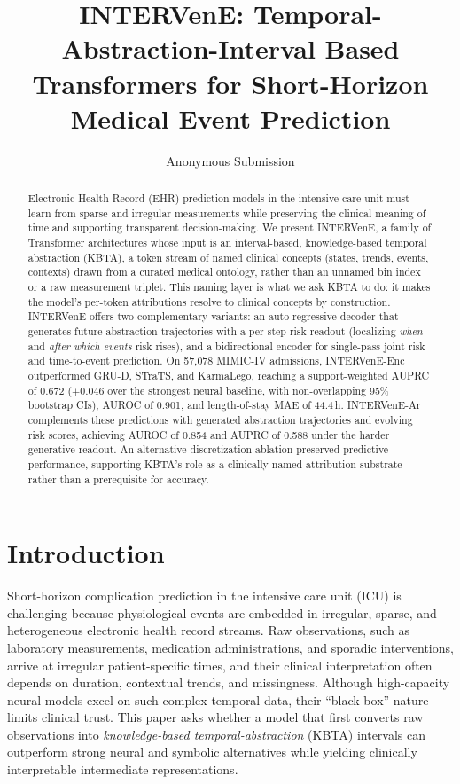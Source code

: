 \documentclass[letterpaper]{article} %
\title{INTERVenE: Temporal-Abstraction-Interval Based Transformers for Short-Horizon Medical Event Prediction}
\author{Anonymous Submission}
\begin{document}
\maketitle

\begin{abstract}
Electronic Health Record (EHR) prediction models in the intensive care unit must learn from sparse and irregular measurements while preserving the clinical meaning of time and supporting transparent decision-making. We present INTERVenE, a family of Transformer architectures whose input is an interval-based, knowledge-based temporal abstraction (KBTA), a token stream of named clinical concepts (states, trends, events, contexts) drawn from a curated medical ontology, rather than an unnamed bin index or a raw measurement triplet. This naming layer is what we ask KBTA to do: it makes the model's per-token attributions resolve to clinical concepts by construction. INTERVenE offers two complementary variants: an auto-regressive decoder that generates future abstraction trajectories with a per-step risk readout (localizing \emph{when} and \emph{after which events} risk rises), and a bidirectional encoder for single-pass joint risk and time-to-event prediction. On 57,078 MIMIC-IV admissions, INTERVenE-Enc outperformed GRU-D, STraTS, and KarmaLego, reaching a support-weighted AUPRC of 0.672 ($+0.046$ over the strongest neural baseline, with non-overlapping 95\% bootstrap CIs), AUROC of 0.901, and length-of-stay MAE of 44.4\,h. INTERVenE-Ar complements these predictions with generated abstraction trajectories and evolving risk scores, achieving AUROC of 0.854 and AUPRC of 0.588 under the harder generative readout. An alternative-discretization ablation preserved predictive performance, supporting KBTA's role as a clinically named attribution substrate rather than a prerequisite for accuracy.
\end{abstract}

\section{Introduction}

Short-horizon complication prediction in the intensive care unit (ICU) is challenging because physiological events are embedded in irregular, sparse, and heterogeneous electronic health record streams. Raw observations, such as laboratory measurements, medication administrations, and sporadic interventions, arrive at irregular patient-specific times, and their clinical interpretation often depends on duration, contextual trends, and missingness. Although high-capacity neural models excel on such complex temporal data, their ``black-box'' nature limits clinical trust. This paper asks whether a model that first converts raw observations into \textit{knowledge-based temporal-abstraction} (KBTA) intervals can outperform strong neural and symbolic alternatives while yielding clinically interpretable intermediate representations.
\end{document}
